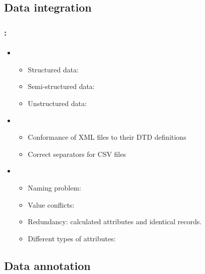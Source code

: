\documentclass[xcolor=table]{beamer}
\begin{document}
\subsection{Data integration}

\begin{frame}
	\frametitle{\insertshortsubtitle: \insertsection}
	\framesubtitle{\insertsubsection}
	
	\begin{itemize}
		\item {}
		\begin{itemize}
			\item Structured data: 
			\item Semi-structured data: 
			\item Unstructured data: 
		\end{itemize}
	
		\item {}
		\begin{itemize}
			\item Conformance of XML files to their DTD definitions
			\item Correct separators for CSV files
		\end{itemize}
	
		\item {}
		\begin{itemize}
			\item Naming problem: 
			\item Value conflicts: 
			\item Redundancy: calculated attributes and identical records.
			\item Different types of attributes: 
		\end{itemize}
	\end{itemize}

\end{frame}


\subsection{Data annotation}
\end{document}
